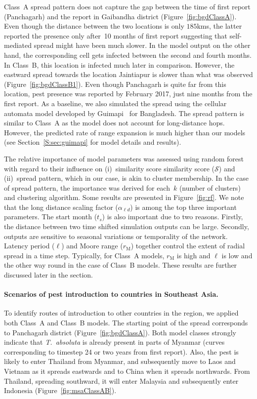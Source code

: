 \documentclass[11pt]{article}
\newcommand{\tuta}{\emph{T.~absoluta}}
\newcommand{\similarity}{\mathcal{S}}
\newcommand{\ald}{\alpha_{\ell d}}
\newcommand{\mooreRange}{r_\mathrm{M}}
\theoremstyle{definition}
\begin{document}
Class~A spread pattern does not capture the gap between the time of first
report (Panchagarh) and the report in Gaibandha district
(Figure~\ref{fig:bgdClassA}). Even though the distance between the two
locations is only $185$kms, the latter reported the presence only after~10
months of first report suggesting that self-mediated spread might have been
much slower. In the model output on the other hand, the corresponding cell
gets infected between the second and fourth months.  In Class~B, this
location is infected much later in comparison. However, the eastward spread
towards the location Jaintiapur is slower than what was observed
(Figure~\ref{fig:bgdClassB1}). Even though Panchagarh is quite far from
this location, pest presence was reported by February 2017, just nine
months from the first report.  As a baseline, we also simulated the spread
using the cellular automata model developed by
Guimapi~\cite{guimapi2016modeling} for Bangladesh. The spread pattern is
similar to Class~A as the model does not account for long-distance hops.
However, the predicted rate of range expansion is much higher than our
models (see Section~\ref{S:sec:guimapi} for model details and results).

The relative importance of model parameters was assessed using random
forest~\cite{breiman2001random} with regard to their influence on
(i)~similarity score similarity score ($\similarity$) and (ii)~spread
pattern, which in our case, is akin to cluster membership. In the case of
spread pattern, the importance was derived for each~$k$ (number of
clusters) and clustering algorithm. Some results are presented in
Figure~\ref{fig:rf}. We note that the long distance scaling factor ($\ald$)
is among the top three important parameters. The start month ($t_s$) is
also important due to two reasons. Firstly, the distance between two time
shifted simulation outputs can be large. Secondly, outputs are sensitive to
seasonal variations or temporality of the network.  Latency period ($\ell$)
and Moore range ($\mooreRange$) together control the extent of radial
spread in a time step. Typically, for Class~A models, $\mooreRange$ is
high and $\ell$ is low and the other way round in the case of Class~B
models. These results are further discussed later in the section.

\paragraph{Scenarios of pest introduction to countries in Southeast Asia.}
To identify routes of introduction to other countries in the region, we
applied both Class~A and Class~B models. The starting point of the spread
corresponds to Panchagarh district (Figure~\ref{fig:bgdClassA}). Both model
classes strongly indicate that \tuta{} is already present in parts of
Myanmar (curves corresponding to timestep 24 or two years from first
report). Also, the pest is likely to enter Thailand from Myanmar, and
subsequently move to Laos and Vietnam as it spreads eastwards and to China
when it spreads northwards. From Thailand, spreading southward, it will
enter Malaysia and subsequently enter Indonesia
(Figure~\ref{fig:msaClassAB}).
\end{document}

